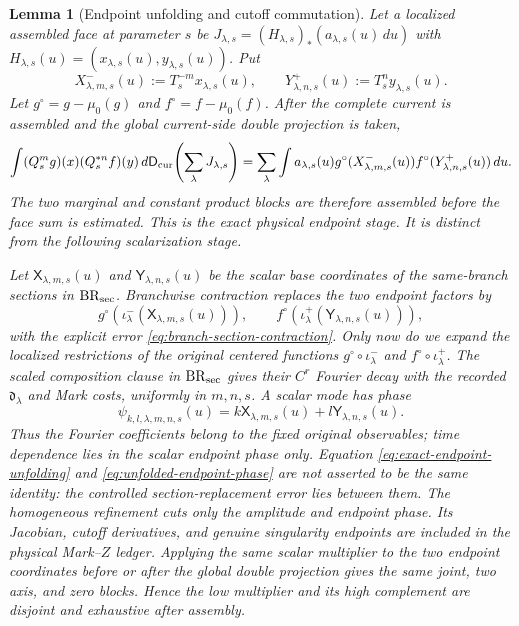 \documentclass[11pt]{article}
\newtheorem{lemma}[theorem]{Lemma}
\begin{document}
\begin{lemma}[Endpoint unfolding and cutoff commutation]
\label{lem:endpoint-unfolding}
Let a localized assembled face at parameter $s$ be
$J_{\lambda,s}=(H_{\lambda,s})_*(a_{\lambda,s}(u)\,du)$ with
$H_{\lambda,s}(u)=(x_{\lambda,s}(u),y_{\lambda,s}(u))$.  Put
\begin{equation}
\label{eq:physical-endpoint-maps}
 X^-_{\lambda,m,s}(u):=T_s^{-m}x_{\lambda,s}(u),\qquad
 Y^+_{\lambda,n,s}(u):=T_s^{n}y_{\lambda,s}(u).
\end{equation}
Let $g^\circ=g-\mu_0(g)$ and $f^\circ=f-\mu_0(f)$.  After the complete
current is assembled and the global current-side double projection is taken,
\begin{equation}
\label{eq:exact-endpoint-unfolding}
 \int (Q_s^mg)(x)(Q_s^{*n}f)(y)\,
       d\mathsf D_{\rm cur}\!\left(\sum_\lambda J_{\lambda,s}\right)
 =\sum_\lambda\int a_{\lambda,s}(u)
   g^\circ(X^-_{\lambda,m,s}(u))
   f^\circ(Y^+_{\lambda,n,s}(u))\,du.
\end{equation}
The two marginal and constant product blocks are therefore assembled before
the face sum is estimated.  This is the exact \emph{physical endpoint}
stage.  It is distinct from the following scalarization stage.

Let $\mathsf X_{\lambda,m,s}(u)$ and
$\mathsf Y_{\lambda,n,s}(u)$ be the scalar base coordinates of the
same-branch sections in $\mathrm{BR}_{\rm sec}$.  Branchwise contraction
replaces the two endpoint factors by
\begin{equation}
\label{eq:endpoint-to-section-stage}
 g^\circ\!\left(\iota^-_\lambda(\mathsf X_{\lambda,m,s}(u))\right),
 \qquad
 f^\circ\!\left(\iota^+_\lambda(\mathsf Y_{\lambda,n,s}(u))\right),
\end{equation}
with the explicit error \eqref{eq:branch-section-contraction}.  Only now do
we expand the localized restrictions of the \emph{original centered}
functions $g^\circ\circ\iota^-_\lambda$ and
$f^\circ\circ\iota^+_\lambda$.  The scaled composition clause in
$\mathrm{BR}_{\rm sec}$ gives their $C^r$ Fourier decay with the recorded
$\mathfrak d_\lambda$ and Mark costs, uniformly in $m,n,s$.  A scalar mode
has phase
\begin{equation}
\label{eq:unfolded-endpoint-phase}
 \psi_{k,l,\lambda,m,n,s}(u)
 =k\mathsf X_{\lambda,m,s}(u)
  +l\mathsf Y_{\lambda,n,s}(u).
\end{equation}
Thus the Fourier coefficients belong to the fixed original observables;
time dependence lies in the scalar endpoint phase only.  Equation
\eqref{eq:exact-endpoint-unfolding} and
\eqref{eq:unfolded-endpoint-phase} are not asserted to be the same identity:
the controlled section-replacement error lies between them.
The homogeneous refinement cuts only the amplitude and endpoint phase.  Its
Jacobian, cutoff derivatives, and genuine singularity endpoints are included
in the physical Mark--$Z$ ledger.  Applying the same scalar multiplier to the
two endpoint coordinates before or after the global double projection gives
the same joint, two axis, and zero blocks.  Hence the low multiplier and its
high complement are disjoint and exhaustive after assembly.
\end{lemma}
\end{document}

